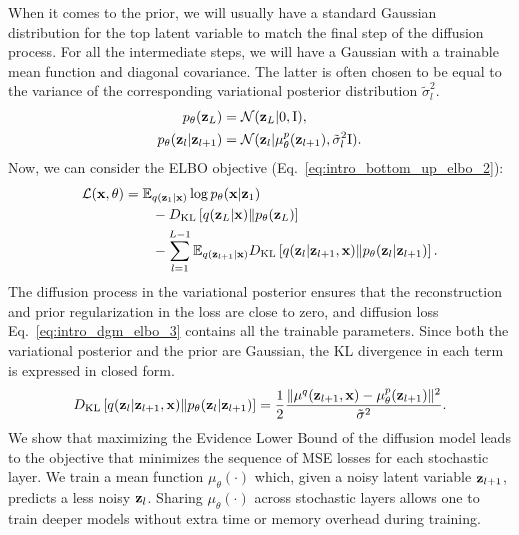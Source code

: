 When it comes to the prior, we will usually have a standard Gaussian distribution for the top latent variable to match the final step of the diffusion process. For all the intermediate steps, we will have a Gaussian with a trainable mean function and diagonal covariance. The latter is often chosen to be equal to the variance of the corresponding variational posterior distribution $\tilde{\sigma}^2_l$. 
\begin{equation}\begin{aligned}
    p_{\theta}({\mathbf{z}}_L) &= \mathcal{N}({\mathbf{z}}_{L} | 0, \text{I}),\\
   p_{\theta}({\mathbf{z}}_l|{\mathbf{z}}_{l+1}) &= \mathcal{N}({\mathbf{z}}_{l} | \mu_{\theta}^p({\mathbf{z}}_{l+1}), \tilde{\sigma}^2_l\text{I}).
   \end{aligned}
\end{equation}
Now, we can consider the ELBO objective (Eq.~\ref{eq:intro_bottom_up_elbo_2}):
\begin{align}
    \mathcal{L}(\rvx, \theta) & =\E_{q(\rvz_{1}|\rvx)}\log p_{\theta}(\rvx|\rvz_{1}) \label{eq:intro_dgm_elbo_1}\\
    &\quad\quad-\KL{ q(\rvz_L|\rvx)}{p_{\theta}(\rvz_L)}\label{eq:intro_dgm_elbo_2}\\
    &\quad\quad- \sum_{l=1}^{L-1} \E_{q(\rvz_{l+1}|\rvx)} \KL{q(\rvz_l|\rvz_{l+1}, \rvx)}{p_{\theta}(\rvz_l|\rvz_{l+1})}. \label{eq:intro_dgm_elbo_3}
\end{align}
The diffusion process in the variational posterior ensures that the reconstruction and prior regularization in the loss are close to zero, and diffusion loss Eq.~\ref{eq:intro_dgm_elbo_3} contains all the trainable parameters. Since both the variational posterior and the prior are Gaussian, the KL divergence in each term is expressed in closed form.
\begin{equation}\label{eq:intro_diff_kl}
    \KL{q(\rvz_l|\rvz_{l+1}, \rvx)}{p_{\theta}(\rvz_l|\rvz_{l+1})} = \frac 12 \frac{\|\mu^q(\rvz_{l+1}, \rvx) - \mu^p_{\theta}(\rvz_{l+1})\|^2}{\tilde{\sigma}^2}.
\end{equation}
We show that maximizing the Evidence Lower Bound of the diffusion model leads to the objective that minimizes the sequence of MSE losses for each stochastic layer. 
We train a mean function $\mu_{\theta}(\cdot)$ which, given a noisy latent variable ${\mathbf{z}}_{l+1}$, predicts a less noisy ${\mathbf{z}}_l$. 
Sharing $\mu_{\theta}(\cdot)$ across stochastic layers allows one to train deeper models without extra time or memory overhead during training. 


